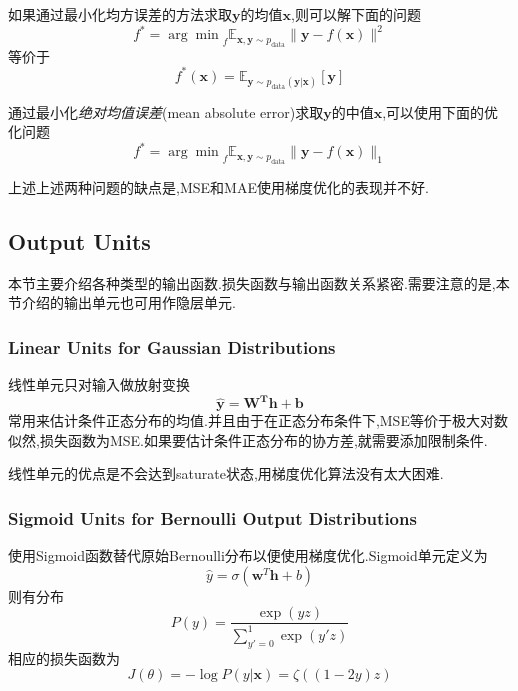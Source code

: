 如果通过最小化均方误差的方法求取$\mathbf y$的均值$\mathbf x$,则可以解下面的问题
\begin{equation}
f^\ast={\arg \min}_{f}\mathbb E_{\mathbf{x,y}\sim p_{\text{data}}}\|\mathbf y-f(\mathbf x)\|^2
\end{equation}
等价于
\begin{equation}
f^\ast(\mathbf x)=\mathbb E_{\mathbf y\sim p_{\text{data}}(\mathbf y|\mathbf x)}[\mathbf y]
\end{equation}

通过最小化\textit{绝对均值误差}(mean absolute error)求取$\mathbf y$的中值$\mathbf x$,可以使用下面的优化问题
\begin{equation}
f^\ast={\arg \min}_{f}\mathbb E_{\mathbf{x,y}\sim p_{\text{data}}}\|\mathbf y-f(\mathbf x)\|_1
\end{equation}

上述上述两种问题的缺点是,MSE和MAE使用梯度优化的表现并不好.

\subsection{Output Units}

本节主要介绍各种类型的输出函数.损失函数与输出函数关系紧密.需要注意的是,本节介绍的输出单元也可用作隐层单元.

\subsubsection{Linear Units for Gaussian Distributions}

线性单元只对输入做放射变换
\begin{equation}
\mathbf{\hat y=W^Th+b}
\end{equation}
常用来估计条件正态分布的均值.并且由于在正态分布条件下,MSE等价于极大对数似然,损失函数为MSE.如果要估计条件正态分布的协方差,就需要添加限制条件.

线性单元的优点是不会达到saturate状态,用梯度优化算法没有太大困难.

\subsubsection{Sigmoid Units for Bernoulli Output Distributions}

使用Sigmoid函数替代原始Bernoulli分布以便使用梯度优化.Sigmoid单元定义为
\begin{equation}
\hat y=\sigma(\mathbf w^T\mathbf h+b)
\end{equation}
则有分布
\begin{equation}
P(y)=\frac{\exp{(yz)}}{\sum_{y'=0}^1\exp(y'z)}
\end{equation}
相应的损失函数为
\begin{equation}
J(\theta)=-\log P(y|\mathbf x)=\zeta((1-2y)z)
\end{equation}

